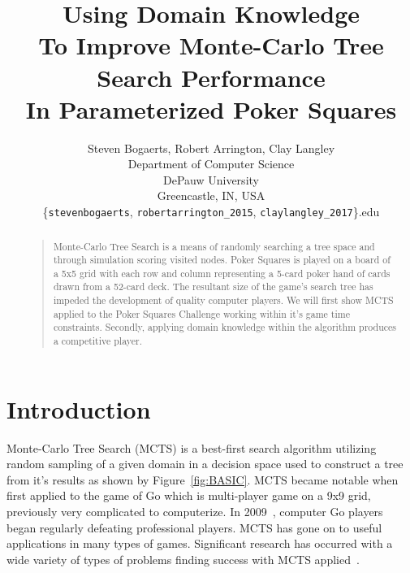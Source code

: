 \documentclass[letterpaper]{article}
\begin{document}
%
\title{Using Domain Knowledge\\To Improve Monte-Carlo Tree Search Performance\\In Parameterized Poker Squares}    %
\author{Steven Bogaerts, Robert Arrington, Clay Langley\\
Department of Computer Science\\
DePauw University\\
Greencastle, IN, USA\\
\{{\tt stevenbogaerts}, {\tt robertarrington\_2015}, {\tt claylangley\_2017}\}{\tt@depauw.edu}
}
\maketitle
\begin{abstract}
\begin{quote}
 Monte-Carlo Tree Search is a means of randomly searching a tree space and through simulation scoring visited nodes. Poker Squares is played on a board of a 5x5 grid with each row and column representing a 5-card poker hand of cards drawn from a 52-card deck. The resultant size of the game's search tree has impeded the development of quality computer players. We will first show MCTS applied to the Poker Squares Challenge working within it's game time constraints. Secondly, applying domain knowledge within the algorithm produces a competitive player.
\end{quote}
\end{abstract}

\section{Introduction}
Monte-Carlo Tree Search (MCTS) is a best-first search algorithm utilizing random sampling of a given domain in a decision space used to construct a tree from it's results as shown by Figure~\ref{fig:BASIC}. MCTS became notable when first applied to the game of Go which is multi-player game on a 9x9 grid, previously very complicated to computerize. In 2009~\cite{chaslot2008monte}, computer Go players began regularly defeating professional players. MCTS has gone on to useful applications in many types of games. Significant research has occurred with a wide variety of types of problems finding success with MCTS applied~\cite{browne2010monte}.
\end{document}
